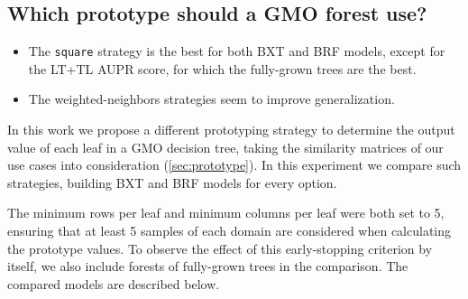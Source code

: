 % 
% 


\subsection{Which prototype should a GMO forest use?}

\label{sec:prototype_comparison}

\begin{mdframed}[frametitle={Key findings}]
    \begin{itemize}
        \item The \texttt{square} strategy is the best for both BXT and BRF models, except for the LT+TL AUPR score, for which the fully-grown trees are the best.
        \item The weighted-neighbors strategies seem to improve generalization.
    \end{itemize}
\end{mdframed}

In this work we propose a different prototyping strategy to determine the output value of each leaf in a GMO decision tree, taking the similarity matrices of our use cases into consideration (\autoref{sec:prototype}).
%
In this experiment we compare such strategies, building BXT and BRF models for every option.

The minimum rows per leaf and minimum columns per leaf were both set to 5, ensuring that at least 5 samples of each domain are considered when calculating the prototype values.
%
To observe the effect of this early-stopping criterion by itself, we also include forests of fully-grown trees in the comparison. The compared models are described below.

